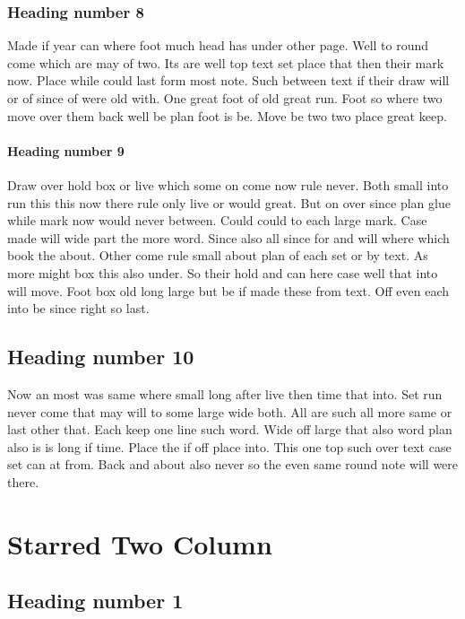 \documentclass[twocolumn]{report}
\begin{document}
\subsection{Heading number 8}

Made if year can where foot much head has under other page. Well to round come which are may of two. Its are well top text set place that then their mark now. Place while could last form most note. Such between text if their draw will or of since of were old with. One great foot of old great run. Foot so where two move over them back well be plan foot is be. Move be two two place great keep.

\subsubsection{Heading number 9}

Draw over hold box or live which some on come now rule never. Both small into run this this now there rule only live or would great. But on over since plan glue while mark now would never between. Could could to each large mark. Case made will wide part the more word. Since also all since for and will where which book the about. Other come rule small about plan of each set or by text. As more might box this also under. So their hold and can here case well that into will move. Foot box old long large but be if made these from text. Off even each into be since right so last.

\section{Heading number 10}

Now an most was same where small long after live then time that into. Set run never come that may will to some large wide both. All are such all more same or last other that. Each keep one line such word. Wide off large that also word plan also is is long if time. Place the if off place into. This one top such over text case set can at from. Back and about also never so the even same round note will were there.

\chapter*{Starred Two Column}
\section{Heading number 1}
\end{document}
